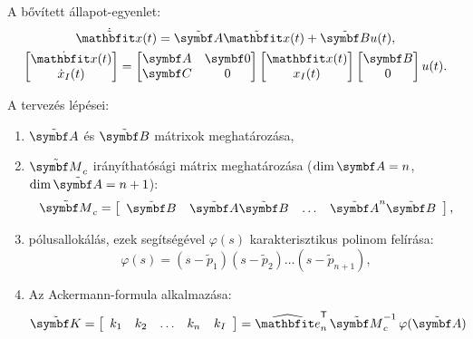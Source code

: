 A bővített állapot-egyenlet:
\begin{gather}
  \dot{\tvec x}(t) = \tmat A \tvec x(t) + \tmat B u(t)
  ,
  \\
  \begin{bmatrix}
    \dot{\rvec x}(t) \\ \dot x_I(t)
  \end{bmatrix} = \begin{bmatrix}
    \rmat A & \rmat 0 \\ \rmat C & 0
  \end{bmatrix} \begin{bmatrix}
    \rvec x(t) \\ x_I(t)
  \end{bmatrix} \begin{bmatrix}
    \rmat B \\ 0
  \end{bmatrix} u(t)
  .
\end{gather}

A tervezés lépései:
\bgroup
\def\arraystretch{1.2}
\begin{enumerate}[label={\color{darkRed}\theenumi})]
  \item $\tmat A$ és $\tmat B$ mátrixok meghatározása,
  \item $\tmat M_c$ irányíthatósági mátrix meghatározása ($\dim \rmat A = n$,
        $\dim \tmat A = n+1$):
        \begin{equation}
          \tmat M_c = \left[\begin{array}{ c : c : c : c }
              \tmat B         &
              \tmat A \tmat B &
              \dots           &
              \tmat A^{n} \tmat B
            \end{array}\right],
        \end{equation}
  \item pólusallokálás, ezek segítségével $\varphi(s)$ karakterisztikus polinom
        felírása:
        \begin{equation}
          \varphi(s) = (s - \tilde p_1)(s - \tilde p_2) \dots (s - \tilde p_{n+1}),
        \end{equation}
  \item Az Ackermann-formula alkalmazása:
        \begin{equation}
          \tmat K = \left[\begin{array}{c c c c : c}
              k_1 & k_2 & \dots & k_n & k_I
            \end{array}\right]
          = \uvec e_n^\T
          \,\tmat M_c^{-1}
          \,\varphi({\tmat A})
        \end{equation}
\end{enumerate}
\egroup

\clearpage
